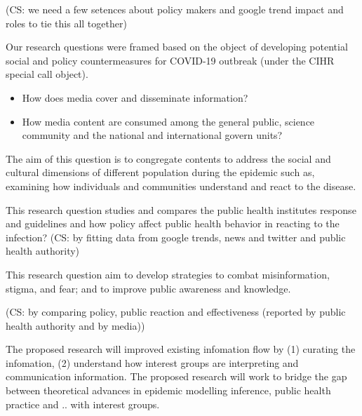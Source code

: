 (CS:  we need a few setences about policy makers and google trend impact and roles to tie this all together)

Our research questions were framed based on the object of developing potential social and policy countermeasures for COVID-19 outbreak (under the CIHR special call object).

\begin{itemize}
\item{How does media cover and disseminate information?}
\item{How media content are consumed among the general public, science community and the national and international govern units?}
\end{itemize}

The aim of this question is to congregate contents to address the social and cultural dimensions of different population during the epidemic such as, examining how individuals and communities understand and react to the disease.


This research question studies and compares the public health institutes response and guidelines and how policy affect public health behavior in reacting to the infection?
(CS: by fitting data from google trends, news and twitter and public health authority)


This research question aim to develop strategies to combat misinformation, stigma, and fear; and to improve public awareness and knowledge.

(CS: by comparing policy, public reaction and effectiveness (reported by public health authority and by media))

The proposed research will improved existing infomation flow by (1) curating the infomation, (2) understand how interest groups are interpreting and communication information. 
The proposed research will work to bridge the gap between theoretical advances in epidemic modelling inference, public health practice and .. with interest groups. 

